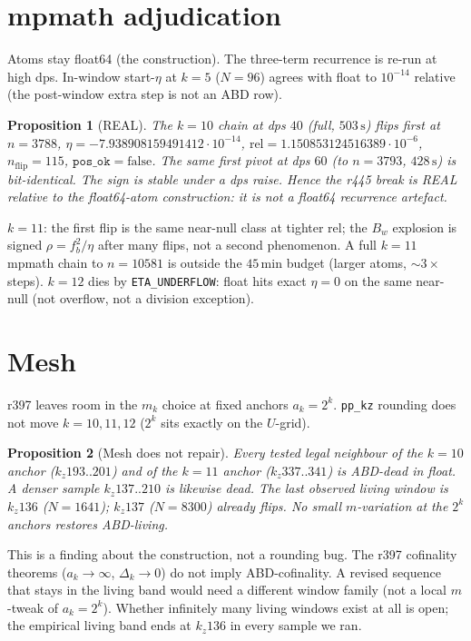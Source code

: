 \documentclass[11pt]{article}
\newtheorem{prop}{Proposition}
\begin{document}
\section{mpmath adjudication}\label{sec:mp}

Atoms stay float64 (the construction).
The three-term recurrence is re-run at high dps.
In-window start-$\eta$ at $k=5$ ($N=96$) agrees
with float to $10^{-14}$ relative
(the post-window extra step is not an ABD row).

\begin{prop}[REAL]\label{prop:real}
The $k=10$ chain at dps $40$ (full, $503\,\mathrm{s}$)
flips first at $n=3788$,
$\eta=-7.938908159491412\cdot 10^{-14}$,
$\mathrm{rel}=1.150853124516389\cdot 10^{-6}$,
$n_{\mathrm{flip}}=115$, $\mathtt{pos\_ok}=\mathrm{false}$.
The same first pivot at dps $60$ (to $n=3793$,
$428\,\mathrm{s}$) is bit-identical.
The sign is stable under a dps raise.
Hence the r445 break is REAL relative to the
float64-atom construction: it is not a
float64 recurrence artefact.
\end{prop}

$k=11$: the first flip is the same near-null
class at tighter $\mathrm{rel}$; the $B_w$
explosion is signed $\rho=f_b^2/\eta$ after
many flips, not a second phenomenon.
A full $k=11$ mpmath chain to $n=10581$ is
outside the $45\,\mathrm{min}$ budget
(larger atoms, $\sim 3\times$ steps).
$k=12$ dies by \texttt{ETA\_UNDERFLOW}:
float hits exact $\eta=0$ on the same
near-null (not overflow, not a division
exception).

\section{Mesh}\label{sec:mesh}

r397 leaves room in the $m_k$ choice at fixed
anchors $a_k=2^k$.
\texttt{pp\_kz} rounding does not move
$k=10,11,12$ ($2^k$ sits exactly on the $U$-grid).

\begin{prop}[Mesh does not repair]\label{prop:mesh}
Every tested legal neighbour of the $k=10$
anchor ($k_z193..201$) and of the $k=11$
anchor ($k_z337..341$) is ABD-dead in float.
A denser sample $k_z137..210$ is likewise dead.
The last observed living window is $k_z136$
($N=1641$); $k_z137$ ($N=8300$) already flips.
No small $m$-variation at the $2^k$ anchors
restores ABD-living.
\end{prop}

This is a finding about the construction,
not a rounding bug.
The r397 cofinality theorems ($a_k\to\infty$,
$\Delta_k\to 0$) do not imply ABD-cofinality.
A revised sequence that stays in the living
band would need a different window family
(not a local $m$-tweak of $a_k=2^k$).
Whether infinitely many living windows exist
at all is open; the empirical living band
ends at $k_z136$ in every sample we ran.
\end{document}
